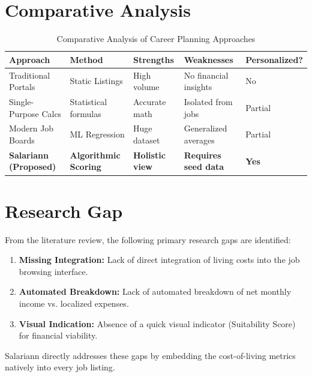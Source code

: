 \section{Comparative Analysis}

\begin{table}[H]
\centering
\caption{Comparative Analysis of Career Planning Approaches}
\vspace{0.2cm}
\begin{tabular}{|p{3cm}|p{3cm}|p{3cm}|p{3cm}|p{2cm}|}
\hline
\textbf{Approach} & \textbf{Method} & \textbf{Strengths} & \textbf{Weaknesses} & \textbf{Personalized?} \\ \hline
Traditional Portals & Static Listings & High volume & No financial insights & No \\ \hline
Single-Purpose Calcs & Statistical formulas & Accurate math & Isolated from jobs & Partial \\ \hline
Modern Job Boards & ML Regression & Huge dataset & Generalized averages & Partial \\ \hline
\textbf{Salariann (Proposed)} & \textbf{Algorithmic Scoring} & \textbf{Holistic view} & \textbf{Requires seed data} & \textbf{Yes} \\ \hline
\end{tabular}
\end{table}

\section{Research Gap}
From the literature review, the following primary research gaps are identified:
\begin{enumerate}
    \item \textbf{Missing Integration:} Lack of direct integration of living costs into the job browsing interface.
    \item \textbf{Automated Breakdown:} Lack of automated breakdown of net monthly income vs. localized expenses.
    \item \textbf{Visual Indication:} Absence of a quick visual indicator (Suitability Score) for financial viability.
\end{enumerate}
Salariann directly addresses these gaps by embedding the cost-of-living metrics natively into every job listing.
